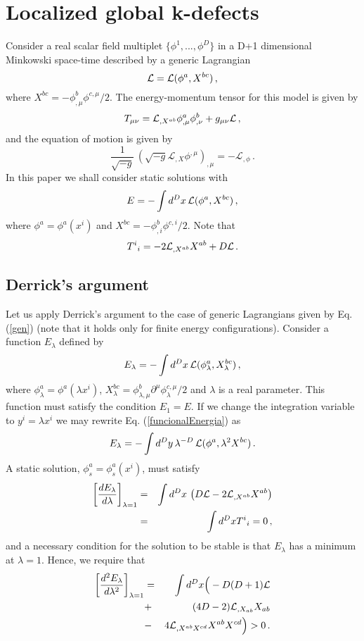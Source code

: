 \documentclass[prd,twocolumn,a4paper,superscriptaddress,floatfix]{revtex4}
\def\be{\begin{equation}}
\def\ee{\end{equation}}
\newcommand{\bq}{\begin{eqnarray}}
\newcommand{\eq}{\end{eqnarray}}
\begin{document}
\section{Localized global k-defects}

Consider a real scalar field multiplet $\{\phi^1, ..., \phi^D\}$ in a D+1 dimensional Minkowski space-time described by a generic  Lagrangian 
\be
\label{gen}
\LL = \LL(\phi^a,X^{bc})\,,
\ee
where $X^{bc}=-\phi^b_{,\mu} \phi^{c,\mu}/2$. The energy-momentum tensor for this model is given by
\be
T_{\mu\nu}=\LL_{,X^{ab}}  \phi^a_{,\mu} \phi^b_{,\nu} + g_{\mu\nu}\LL\,,
\ee
and the equation  of motion is given by
\be
\label{eqmotion}
\frac{1}{\sqrt{-g}}\, \left(\sqrt{-g}\mathcal{L}_{,X}\phi^{,\mu}\right)_{,\mu}=-\mathcal{L}_{,\phi}\,.
\ee
In this paper we shall consider static solutions with
\be
E=-\int d^D x \,\LL(\phi^a,X^{bc})\,,
\ee
where $\phi^a=\phi^a(x^i)$ and $X^{bc}=-\phi^b_{,i} \phi^{c,i}/2$. Note that
\be
{T^i}_i=-2 \LL_{,X^{ab}}  X^{ab} + D \LL\,.
\ee
 
\subsection{Derrick's argument}

Let us apply Derrick's argument to the case of generic Lagrangians given by Eq. (\ref{gen}) (note that it holds only for finite energy configurations). Consider a function 
$E_\lambda$ defined by
\be\label{funcionalEnergia}
E_\lambda=-\int d^D x \,\LL(\phi^a_\lambda,X^{bc}_\lambda)\,, 
\ee
where $\phi^a_\lambda=\phi^a(\lambda x^i)$, $X^{bc}_\lambda=\phi^b_{\lambda,\mu} \partial^\mu \phi^{c,\mu}_\lambda/2$ and $\lambda$ is a real parameter. This function must satisfy the condition $E_1=E$. If we change the integration variable to $y^i=\lambda x^i$ we may rewrite Eq. (\ref{funcionalEnergia}) as
\be\label{funcionalEnergia2}
E_\lambda=-\int d^D y \,\lambda^{-D} \,\LL(\phi^a,\lambda^2 X^{bc})\,.
\ee
A static solution,  $\phi^a_s=\phi^a_s(x^i)$, must satisfy 
\bq\label{Dcondition}
\left[\frac{dE_\lambda}{d\lambda}\right]_{\lambda=1}&=&\int d^D x \,\left(D\LL-2\LL_{,X^{ab}} X^{ab}\right)\nonumber\\ 
&=& \int d^D x {T^i}_i=0\,,
\eq
and a necessary condition for the solution to be stable is that $E_\lambda$ has a minimum at $\lambda=1$. Hence, we 
require that
\bq
\label{D2condition}
\left[\frac{d^2E_\lambda}{d\lambda^2}\right]_{\lambda=1}&=&
\int d^D x \Big( -D({D+1})\LL \Big. \nonumber\\
&+&(4D-2) \LL_{,X_{ab}}X_{ab} \nonumber\\
&-&\Big. 4 \LL_{,X^{ab}X^{cd}}X^{ab} X^{cd}\Big) > 0\,.
\eq
\end{document}

